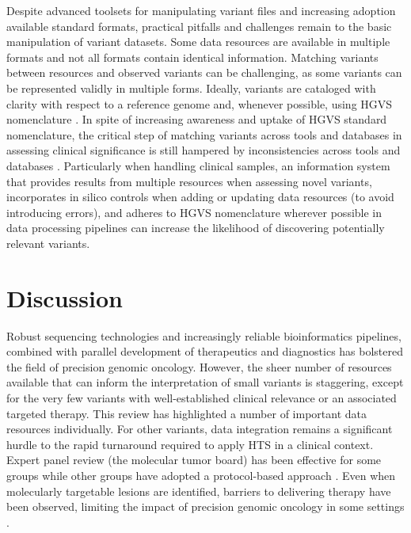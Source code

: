 \documentclass[10pt,letterpaper]{article}
\begin{document}
Despite advanced toolsets for manipulating variant files and
increasing adoption available standard formats, practical pitfalls and
challenges remain to the basic manipulation of variant datasets. Some
data resources are available in multiple formats and not all formats
contain identical information. Matching variants between resources and
observed variants can be challenging, as some variants can be
represented validly in multiple forms. Ideally, variants are cataloged
with clarity with respect to a reference genome and, whenever
possible, using HGVS nomenclature \cite{Den_Dunnen2016-gw}. In spite
of increasing awareness and uptake of HGVS standard nomenclature, the
critical step of matching variants across tools and databases in
assessing clinical significance is still hampered by inconsistencies
across tools and databases \cite{Yen2017-lq}. Particularly when
handling clinical samples, an information system that provides results
from multiple resources when assessing novel variants, incorporates in
silico controls when adding or updating data resources (to avoid
introducing errors), and adheres to HGVS nomenclature wherever
possible in data processing pipelines can increase the likelihood of
discovering potentially relevant variants.

\section{Discussion}

Robust sequencing technologies and increasingly reliable
bioinformatics pipelines, combined with parallel development of
therapeutics and diagnostics has bolstered the field of precision
genomic oncology. However, the sheer number of resources available
that can inform the interpretation of small variants is staggering,
except for the very few variants with well-established clinical
relevance or an associated targeted therapy. This review has
highlighted a number of important data resources individually. For
other variants, data integration remains a significant hurdle to the
rapid turnaround required to apply HTS in a clinical context. Expert
panel review (the molecular tumor board) has been effective for some
groups \cite{Knepper2017-no,Beltran2015-pz,Sohal2015-bi} while other
groups have adopted a protocol-based approach
\cite{Ghazani2017-oo}. Even when molecularly targetable lesions are
identified, barriers to delivering therapy have been observed,
limiting the impact of precision genomic oncology in some settings
\cite{Bryce2017-ht}.
\end{document}
